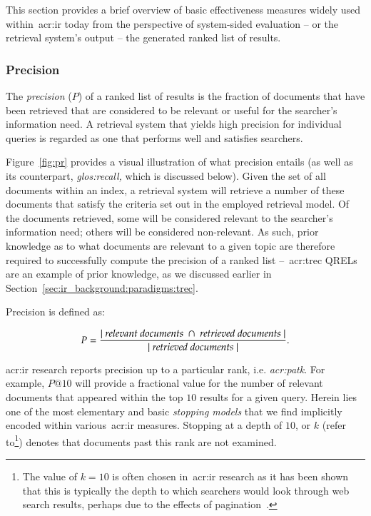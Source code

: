 This section provides a brief overview of basic effectiveness measures widely used within~\gls{acr:ir} today from the perspective of system-sided evaluation -- or the retrieval system's output -- the generated ranked list of results.

\subsubsection{Precision}\label{sec:ir_background:evaluation:system:precision}
The \emph{precision} ($P$) of a ranked list of results is the fraction of documents that have been retrieved that are considered to be relevant or useful for the searcher's information need. A retrieval system that yields high precision for individual queries is regarded as one that performs well and satisfies searchers.

Figure~\ref{fig:pr} provides a visual illustration of what precision entails (as well as its counterpart, \emph{\gls{glos:recall},} which is discussed below). Given the set of all documents within an index, a retrieval system will retrieve a number of these documents that satisfy the criteria set out in the employed retrieval model. Of the documents retrieved, some will be considered relevant to the searcher's information need; others will be considered non-relevant. As such, prior knowledge as to what documents are relevant to a given topic are therefore required to successfully compute the precision of a ranked list --~\gls{acr:trec} QRELs are an example of prior knowledge, as we discussed earlier in Section~\ref{sec:ir_background:paradigms:trec}.

Precision is defined as:

\begin{equation}
P = \frac{|~\text{\emph{relevant documents}}~\cap~\text{\emph{retrieved documents}}~|}{|~\text{\emph{retrieved documents}}~|}.
\end{equation}

\gls{acr:ir} research reports precision up to a particular rank, i.e. \emph{\gls{acr:patk}}. For example, $P@10$ will provide a fractional value for the number of relevant documents that appeared within the top $10$ results for a given query. Herein lies one of the most elementary and basic \emph{stopping models} that we find implicitly encoded within various~\gls{acr:ir} measures. Stopping at a depth of $10$, or $k$ (refer to\footnote{The value of $k=10$ is often chosen in~\gls{acr:ir} research as it has been shown that this is typically the depth to which searchers would look through web search results, perhaps due to the effects of pagination~\citep{jansen2006www}.}) denotes that documents past this rank are not examined.

